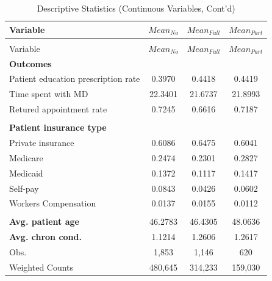 \documentclass[12pt]{report}
\begin{document}
\newpage
{\footnotesize
\begin{center}
\label{tab:desc2}

\begin{longtable}{lccc}
\caption{Descriptive Statistics (Continuous Variables)}\\

\hline \hline
Variable   & $Mean_{No}$ & $Mean_{Full}$ & $Mean_{Part}$ \\ \hline \endfirsthead

\caption*{Descriptive Statistics (Continuous Variables, Cont'd)}\\

\hline \hline
Variable   & $Mean_{No}$ & $Mean_{Full}$ & $Mean_{Part}$ \\ \hline \endhead

\hline \endfoot
\hline \hline  \endlastfoot

\textbf{Outcomes}                   &           &             &             \\
Patient education prescription rate & 0.3970    & 0.4418      & 0.4419      \\
Time spent with MD                  & 22.3401   & 21.6737     & 21.8993     \\
Retured appointment rate            & 0.7245    & 0.6616      & 0.7187      \\
                                    &           &             &             \\
\textbf{Patient insurance type}     &           &             &             \\
Private insurance                   & 0.6086    & 0.6475      & 0.6041      \\
Medicare                            & 0.2474    & 0.2301      & 0.2827      \\
Medicaid                            & 0.1372    & 0.1117      & 0.1417      \\
Self-pay                            & 0.0843    & 0.0426      & 0.0602      \\
Workers Compensation                & 0.0137    & 0.0155      & 0.0112      \\
                                    &           &             &             \\
\textbf{Avg. patient age}           & 46.2783   & 46.4305     & 48.0636     \\
\textbf{Avg. chron cond.}           & 1.1214    & 1.2606      & 1.2617      \\ 
Obs.                                & 1,853     & 1,146       & 620         \\
Weighted Counts                     & 480,645   & 314,233     & 159,030     \\
\end{longtable}
\end{center}}
\end{document}
